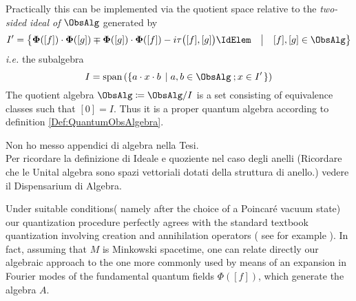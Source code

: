\documentclass[Main]{subfiles}
\begin{document}
   		 		Practically this can be implemented via the quotient space relative to the \emph{two-sided ideal of} $\ObsAlg$ generated by
   		 		\begin{displaymath}
	 					I'= \big\{
   		 					 \mathbf{\Phi}([f]) \cdot \mathbf{\Phi}([g])  \mp \mathbf{\Phi}([g]) \cdot \mathbf{\Phi}([f]) - 
   		 				i \tau\big( [f], [g] \big)\IdElem \quad \big \vert \quad [f],[g]\in \ObsAlg
   		 					 \big\}
   		 		\end{displaymath}
   		 		\textit{i.e.} the subalgebra
   		 		\begin{displaymath}
   		 			I= \textrm{span} \left( \left\lbrace a \cdot x \cdot b\; \left\vert\;  a,b \in \ObsAlg \: ; x \in I'\right. \right\rbrace \right)
   		 		\end{displaymath}
   		 		The quotient algebra $\mathbf{\ObsAlg} \coloneqq \ObsAlg / I$ is a set consisting of equivalence classes  such that $[0] = I$.
   		 		Thus it is a proper quantum algebra according to definition \ref{Def:QuantumObsAlgebra}. 

\ifToninus
	\begin{Warning}
		Non ho messo appendici di algebra nella Tesi. \\
		Per ricordare la definizione di Ideale e quoziente nel caso degli anelli (Ricordare che le Unital algebra sono spazi vettoriali dotati della struttura di anello.) vedere il Dispensarium di Algebra.
	\end{Warning}
\fi
   			
			\begin{remark}
			Under suitable conditions( namely after the choice of a Poincaré vacuum state) our quantization procedure perfectly agrees with the standard textbook quantization involving creation and annihilation operators ( see for example \cite{Mandl}). 
			In fact, assuming that $M$ is Minkowski spacetime, one can relate directly our algebraic approach to the one more commonly used by means of an expansion in Fourier modes of the fundamental quantum fields $\Phi([ f ])$, which generate the algebra $A$.
			\end{remark}   			
   			
\end{document}
